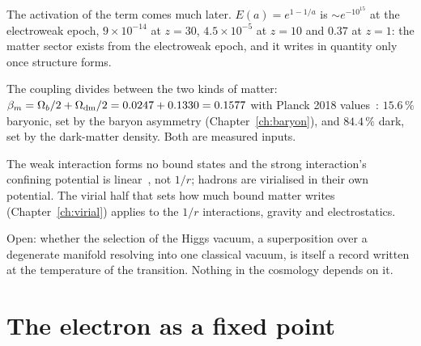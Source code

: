 The activation of the term comes much later. $E(a)=e^{1-1/a}$ is $\sim e^{-10^{15}}$ at the electroweak epoch, $9\times10^{-14}$ at $z=30$, $4.5\times10^{-5}$
at $z=10$ and $0.37$ at $z=1$: the matter sector exists from the electroweak epoch, and it writes in quantity only once structure forms. \calc

The coupling divides between the two kinds of matter: $\beta_m=\Omega_b/2+\Omega_{\rm dm}/2=0.0247+0.1330=0.1577$ with Planck 2018 values~\cite{Planck2018VI}: $15.6\,\%$
baryonic, set by the baryon asymmetry (Chapter~\ref{ch:baryon}), and $84.4\,\%$ dark, set by the dark-matter density. Both are measured inputs. \calc

The weak interaction forms no bound states and the strong interaction's confining potential is linear~\cite{Eichten1978}, not $1/r$; hadrons are virialised in their own
potential. The virial half that sets how much bound matter writes (Chapter~\ref{ch:virial}) applies to the $1/r$ interactions, gravity and electrostatics.

Open: whether the selection of the Higgs vacuum, a superposition over a degenerate manifold resolving into one classical vacuum, is itself a record
written at the temperature of the transition. Nothing in the cosmology depends on it.

\section{The electron as a fixed point}

